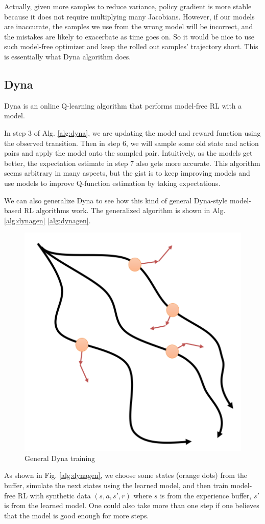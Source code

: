 Actually, given more samples to reduce variance, policy gradient is more stable because it does not require multiplying many Jacobians. However, if our models are inaccurate, the samples we use from the wrong model will be incorrect, and the mistakes are likely to exacerbate as time goes on. So it would be nice to use such model-free optimizer and keep the rolled out samples' trajectory short. This is essentially what Dyna algorithm does.

\subsection{Dyna}
Dyna is an online Q-learning algorithm that performs model-free RL with a model. 

In step 3 of Alg. \ref{alg:dyna}, we are updating the model and reward function using the observed transition. Then in step 6, we will sample some old state and action pairs and apply the model onto the sampled pair. Intuitively, as the models get better, the expectation estimate in step 7 also gets more accurate. This algorithm seems arbitrary in many aspects, but the gist is to keep improving models and use models to improve Q-function estimation by taking expectations. 

We can also generalize Dyna to see how this kind of general Dyna-style model-based RL algorithms work. The generalized algorithm is shown in Alg. \ref{alg:dynagen} \ref{alg:dynagen}.

\begin{figure}
    \centering
    \includegraphics[scale=0.4]{figures/dynarollout.png}
    \caption{General Dyna training}
    \label{fig:dynarollout}
\end{figure}
As shown in Fig. \ref{alg:dynagen}, we choose some states (orange dots) from the buffer, simulate the next states using the learned model, and then train model-free RL with synthetic data $(s,a,s',r)$ where $s$ is from the experience buffer, $s'$ is from the learned model. One could also take more than one step if one believes that the model is good enough for more steps. 

